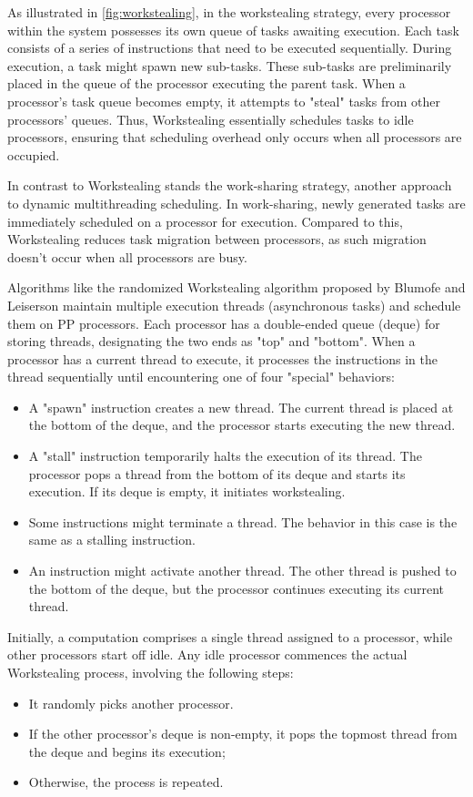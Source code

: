 \documentclass{mproj}
\begin{document}
As illustrated in \ref{fig:workstealing},
in the workstealing strategy, every processor within the system possesses its own queue of tasks awaiting execution.
Each task consists of a series of instructions that need to be executed sequentially.
During execution, a task might spawn new sub-tasks.
These sub-tasks are preliminarily placed in the queue of the processor executing the parent task.
When a processor's task queue becomes empty, it attempts to "steal" tasks from other processors' queues.
Thus, Workstealing essentially schedules tasks to idle processors,
ensuring that scheduling overhead only occurs when all processors are occupied\cite{10.1145/1248377.1248396}.

In contrast to Workstealing stands the work-sharing strategy,
another approach to dynamic multithreading scheduling.
In work-sharing, newly generated tasks are immediately scheduled on a processor for execution.
Compared to this, Workstealing reduces task migration between processors,
as such migration doesn't occur when all processors are busy\cite{10.1145/324133.324234}.

Algorithms like the randomized Workstealing algorithm proposed by Blumofe and Leiserson maintain multiple execution threads (asynchronous tasks) and schedule them on PP processors\cite{10.1145/324133.324234}.
Each processor has a double-ended queue (deque) for storing threads,
designating the two ends as "top" and "bottom".
When a processor has a current thread to execute,
it processes the instructions in the thread sequentially until encountering one of four "special" behaviors:
\begin{itemize}
    \item A "spawn" instruction creates a new thread. The current thread is placed at the bottom of the deque, and the processor starts executing the new thread.
    \item A "stall" instruction temporarily halts the execution of its thread. The processor pops a thread from the bottom of its deque and starts its execution. If its deque is empty, it initiates workstealing.
    \item Some instructions might terminate a thread. The behavior in this case is the same as a stalling instruction.
    \item An instruction might activate another thread. The other thread is pushed to the bottom of the deque, but the processor continues executing its current thread.
\end{itemize}
Initially, a computation comprises a single thread assigned to a processor, while other processors start off idle.
Any idle processor commences the actual Workstealing process, involving the following steps:
\begin{itemize}
    \item It randomly picks another processor.
    \item If the other processor's deque is non-empty, it pops the topmost thread from the deque and begins its execution;
    \item Otherwise, the process is repeated.
\end{itemize}
\end{document}
